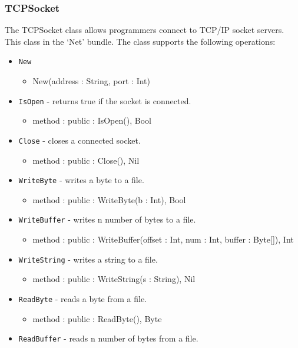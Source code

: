 \documentclass[12pt]{article}
\begin{document}
\subsubsection{TCPSocket}
The TCPSocket class allows programmers connect to TCP/IP socket servers.  This class in the `Net' bundle.  The class supports the following operations:
\begin{itemize}
\item \texttt{New}
  \begin{itemize}
  \item New(address : String, port : Int)
  \end{itemize}
\item \texttt{IsOpen} - returns true if the socket is connected.
  \begin{itemize}
  \item method : public : IsOpen(), Bool
  \end{itemize}
\item \texttt{Close} - closes a connected socket.
  \begin{itemize}
  \item method : public : Close(), Nil
  \end{itemize}
\item \texttt{WriteByte} - writes a byte to a file.
  \begin{itemize}
  \item method : public : WriteByte(b : Int), Bool
  \end{itemize}
\item \texttt{WriteBuffer} - writes n number of bytes to a file.
  \begin{itemize}
  \item method : public : WriteBuffer(offset : Int, num : Int, buffer : Byte[]), Int
  \end{itemize}
\item \texttt{WriteString} - writes a string to a file.
  \begin{itemize}
  \item method : public : WriteString(s : String), Nil
  \end{itemize}
\item \texttt{ReadByte} - reads a byte from a file.
  \begin{itemize}
  \item method : public : ReadByte(), Byte
  \end{itemize}
\item \texttt{ReadBuffer} - reads n number of bytes from a file.
  \begin{itemize}

\end{itemize}
\end{itemize}
\end{document}
